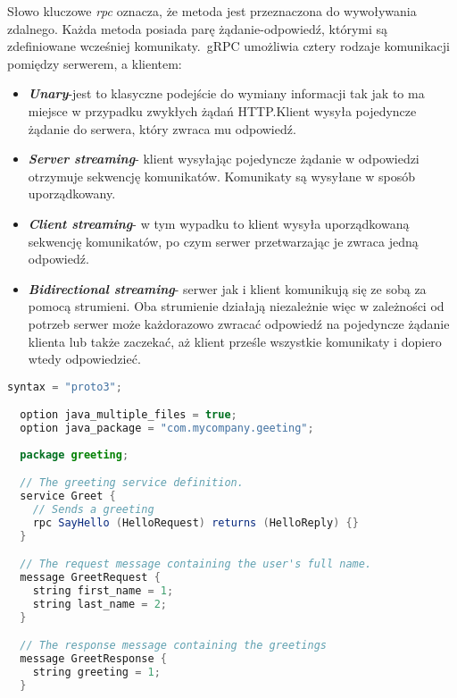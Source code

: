 \noindent
Słowo kluczowe \textit{rpc} oznacza, że metoda jest przeznaczona do wywoływania zdalnego. Każda metoda posiada parę żądanie-odpowiedź, którymi są zdefiniowane wcześniej komunikaty.\ gRPC umożliwia cztery rodzaje komunikacji pomiędzy serwerem, a klientem:
\begin{itemize}
  \item \textbf{\textit{Unary}}-jest to klasyczne podejście do wymiany informacji tak jak to ma miejsce w przypadku zwykłych żądań HTTP.\@ Klient wysyła pojedyncze żądanie do serwera, który zwraca mu odpowiedź.
  \item \textbf{\textit{Server streaming}}- klient wysyłając pojedyncze żądanie w odpowiedzi otrzymuje sekwencję komunikatów. Komunikaty są wysyłane w sposób uporządkowany.
  \item \textbf{\textit{Client streaming}}- w tym wypadku to klient wysyła uporządkowaną sekwencję komunikatów, po czym serwer przetwarzając je zwraca jedną odpowiedź.
  \item \textbf{\textit{Bidirectional streaming}}- serwer jak i klient komunikują się ze sobą za pomocą strumieni. Oba strumienie działają niezależnie więc w zależności od potrzeb serwer może każdorazowo zwracać odpowiedź na pojedyncze żądanie klienta lub także zaczekać, aż klient prześle wszystkie komunikaty i dopiero wtedy odpowiedzieć.   
\end{itemize}
\begin{lstlisting}[language=java, caption=Przykład definicji usługi w pliku proto]
  syntax = "proto3";

  option java_multiple_files = true;
  option java_package = "com.mycompany.geeting";
 
  package greeting;

  // The greeting service definition.
  service Greet {
    // Sends a greeting
    rpc SayHello (HelloRequest) returns (HelloReply) {}
  }

  // The request message containing the user's full name.
  message GreetRequest {
    string first_name = 1;
    string last_name = 2;
  }

  // The response message containing the greetings
  message GreetResponse {
    string greeting = 1;
  }
\end{lstlisting}